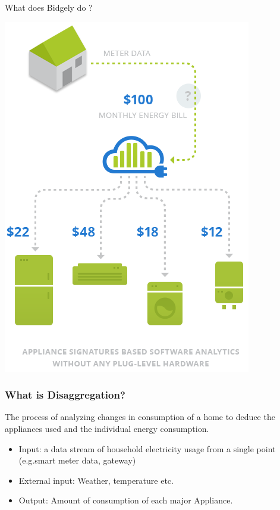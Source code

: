 \documentclass[xcolor=svgnames,handout]{beamer}
\begin{document}
\begin{frame}{What does Bidgely do ?}
  \begin{center}
    \includegraphics[scale=0.35]{bidgely_overview}
  \end{center}
\end{frame}



\begin{frame}
  \frametitle{What is Disaggregation?}

  The process of analyzing changes in consumption of a home to deduce
  the appliances used and the individual energy consumption.

  \begin{itemize}
  \item Input: a data stream of household electricity usage from a single
    point (e.g.smart meter data, gateway)
  \item External input: Weather, temperature etc.
  \item Output: Amount of consumption of each major Appliance.
  \end{itemize}
\end{frame}
\end{document}
